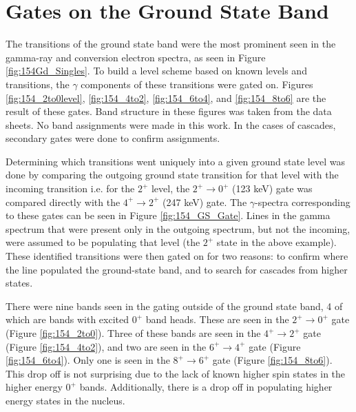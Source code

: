 \afterpage{\clearpage}

\section{Gates on the Ground State Band}
\label{sec:154GS_Gates}

The transitions of the ground state band were the most prominent seen in the gamma-ray and conversion electron spectra, as seen in Figure \ref{fig:154Gd_Singles}. To build a level scheme based on known levels and transitions, the $\gamma$ components of these transitions were gated on. Figures \ref{fig:154_2to0level}, \ref{fig:154_4to2}, \ref{fig:154_6to4}, and \ref{fig:154_8to6} are the result of these gates. Band structure in these figures was taken from the data sheets. No band assignments were made in this work. In the cases of cascades, secondary gates were done to confirm assignments.

Determining which transitions went uniquely into a given ground state level was done by comparing the outgoing ground state transition for that level with the incoming transition i.e. for the $2^+$ level, the $2^+\rightarrow0^+$ (123 keV) gate was compared directly with the $4^+\rightarrow2^+$ (247 keV) gate. The $\gamma$-spectra corresponding to these gates can be seen in Figure \ref{fig:154_GS_Gate}. Lines in the gamma spectrum that were present only in the outgoing spectrum, but not the incoming, were assumed to be populating that level (the $2^+$ state in the above example). These identified transitions were then gated on for two reasons: to confirm where the line populated the ground-state band, and to search for cascades from higher states.



There were nine bands seen in the gating outside of the ground state band, 4 of which are bands with excited $0^+$ band heads. These are seen in the $2^+\rightarrow0^+$ gate (Figure \ref{fig:154_2to0}). Three of these bands are seen in the $4^+\rightarrow2^+$ gate (Figure \ref{fig:154_4to2}), and two are seen in the $6^+\rightarrow4^+$ gate (Figure \ref{fig:154_6to4}). Only one is seen in the $8^+\rightarrow6^+$ gate (Figure \ref{fig:154_8to6}). This drop off is not surprising due to the lack of known higher spin states in the higher energy $0^+$ bands. Additionally, there is a drop off in populating higher energy states in the nucleus.



